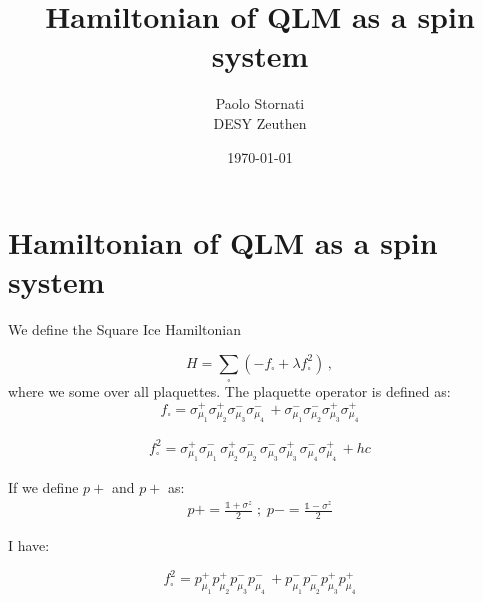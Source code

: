 \documentclass[12pt, a4paper, twoside, titlepage]{article}
\title{Hamiltonian of QLM as a spin system }
\author{Paolo Stornati \\
	DESY  Zeuthen \\
	}
\date{\today}
\begin{document}




\section{Hamiltonian of QLM as a spin system}

We define the Square Ice Hamiltonian

\begin{equation}
    H = \sum_\square (-f_\square + \lambda f^2_\square)\,,\label{eq:hamiltonian}
\end{equation}
where we some over all plaquettes. The plaquette operator is defined as:
\begin{equation}\label{eq:plaquette}
       f_\square = \sigma^+_{\mu_1}\sigma^+_{\mu_2}\sigma^-_{\mu_3}\sigma^-_{\mu_4}\, +  \sigma^-_{\mu_1}\sigma^-_{\mu_2}\sigma^+_{\mu_3}\sigma^+_{\mu_4}
\end{equation}

\begin{align}
	f^2_\square= \sigma^+_{\mu_1} \sigma^-_{\mu_1} \, \sigma^+_{\mu_2} \sigma^-_{\mu_2} \, \sigma^-_{\mu_3} \sigma^+_{\mu_3} \, \sigma^-_{\mu_4} \sigma^+_{\mu_4}  \, + hc
\end{align}

If we define $p+$ and $p+$ as:
\begin{align}
	p+= \frac{ \mathbb{1} + \sigma^z }{2} \; ;	\; p-= \frac{ \mathbb{1} - \sigma^z }{2}
\end{align}

I have:

\begin{equation}\label{eq:plaquette}
	f^2_\square = p^+_{\mu_1}p^+_{\mu_2} p^-_{\mu_3} p^-_{\mu_4}\, +  p^-_{\mu_1} p^-_{\mu_2} p^+_{\mu_3} p^+_{\mu_4}
\end{equation}



\end{document}
